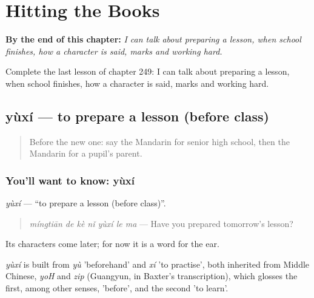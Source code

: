 
\chapter{Hitting the Books}
\label{ch:zh-hitting-the-books}

\begin{chapteropening}
\textbf{By the end of this chapter:} \emph{I can talk about preparing a lesson, when school finishes, how a character is said, marks and working hard.}

Complete the last lesson of chapter 249: I can talk about preparing a lesson, when school finishes, how a character is said, marks and working hard.
\end{chapteropening}

\section[yùxí]{yùxí — to prepare a lesson (before class)}

\label{lesson:ZH-C249-yuxi}



\begin{quote}
Before the new one: say the Mandarin for senior high school, then the Mandarin for a pupil's parent.
\end{quote}

\subsection*{You'll want to know: yùxí}
\emph{yùxí} — \textquotedblleft{}to prepare a lesson (before class)\textquotedblright{}.

\begin{quote}
\emph{míngtiān de kè nǐ yùxí le ma} — Have you prepared tomorrow's lesson?
\end{quote}

Its characters come later; for now it is a word for the ear.

\begin{cousinweb}
\emph{yùxí} is built from \emph{yù} 'beforehand' and \emph{xí} 'to practise', both inherited from Middle Chinese, \emph{yoH} and \emph{zip} (Guangyun, in Baxter's transcription), which glosses the first, among other senses, 'before', and the second 'to learn'.
\end{cousinweb}

